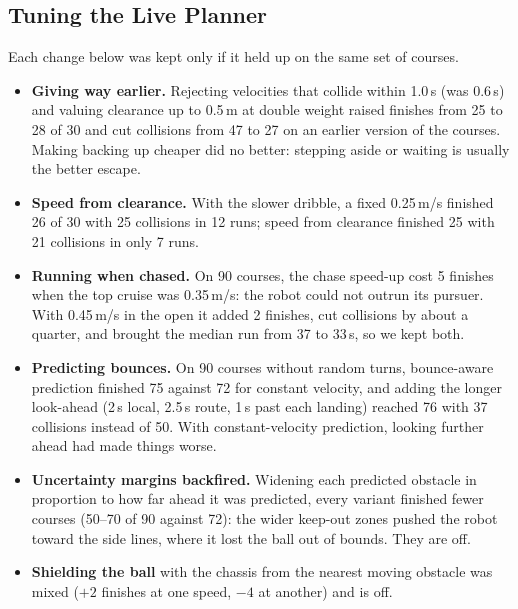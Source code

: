 \documentclass[10pt,twocolumn]{article}
\begin{document}
\subsection{Tuning the Live Planner}
Each change below was kept only if it held up on the same set of courses.
\begin{itemize}[leftmargin=*,itemsep=1pt,topsep=2pt]
\item \textbf{Giving way earlier.} Rejecting velocities that collide within
1.0\,s (was 0.6\,s) and valuing clearance up to 0.5\,m at double weight
raised finishes from 25 to 28 of 30 and cut collisions from 47 to 27 on
an earlier version of the courses.
Making backing up cheaper did no better: stepping aside or waiting is
usually the better escape.
\item \textbf{Speed from clearance.} With the slower dribble, a fixed
0.25\,m/s finished 26 of 30 with 25 collisions in 12 runs; speed from
clearance finished 25 with 21 collisions in only 7 runs.
\item \textbf{Running when chased.} On 90 courses, the chase speed-up cost
5 finishes when the top cruise was 0.35\,m/s: the robot could not
outrun its pursuer. With 0.45\,m/s in the open it added 2 finishes, cut
collisions by about a quarter, and brought the median run from 37 to
33\,s, so we kept both.
\item \textbf{Predicting bounces.} On 90 courses without random turns,
bounce-aware prediction finished 75 against 72 for constant velocity, and
adding the longer look-ahead (2\,s local, 2.5\,s route, 1\,s past each
landing) reached 76 with 37 collisions instead of 50. With constant-velocity
prediction, looking further ahead had made things worse.
\item \textbf{Uncertainty margins backfired.} Widening each predicted
obstacle in proportion to how far ahead it was predicted, every variant
finished fewer courses (50--70 of 90 against 72): the wider keep-out zones
pushed the robot toward the side lines, where it lost the ball out of
bounds. They are off.
\item \textbf{Shielding the ball} with the chassis from the nearest moving
obstacle was mixed ($+2$ finishes at one speed, $-4$ at another) and is
off.
\end{itemize}
\end{document}

